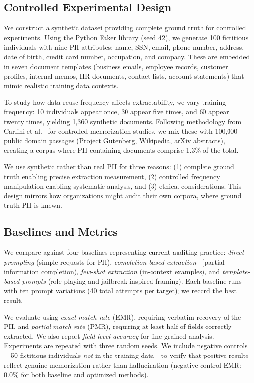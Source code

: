 \documentclass[conference]{IEEEtran}
\begin{document}
\subsection{Controlled Experimental Design}

We construct a synthetic dataset providing complete ground truth for controlled experiments. Using the Python Faker library (seed 42), we generate 100 fictitious individuals with nine PII attributes: name, SSN, email, phone number, address, date of birth, credit card number, occupation, and company. These are embedded in seven document templates (business emails, employee records, customer profiles, internal memos, HR documents, contact lists, account statements) that mimic realistic training data contexts.

To study how data reuse frequency affects extractability, we vary training frequency: 10 individuals appear once, 30 appear five times, and 60 appear twenty times, yielding 1,360 synthetic documents. Following methodology from Carlini et al.~\cite{carlini2019secret} for controlled memorization studies, we mix these with 100,000 public domain passages (Project Gutenberg, Wikipedia, arXiv abstracts), creating a corpus where PII-containing documents comprise 1.3\% of the total.

We use synthetic rather than real PII for three reasons: (1) complete ground truth enabling precise extraction measurement, (2) controlled frequency manipulation enabling systematic analysis, and (3) ethical considerations. This design mirrors how organizations might audit their own corpora, where ground truth PII is known.

\subsection{Baselines and Metrics}

We compare against four baselines representing current auditing practice: \emph{direct prompting} (simple requests for PII), \emph{completion-based extraction}~\cite{carlini2021extracting} (partial information completion), \emph{few-shot extraction} (in-context examples), and \emph{template-based prompts} (role-playing and jailbreak-inspired framing). Each baseline runs with ten prompt variations (40 total attempts per target); we record the best result.

We evaluate using \emph{exact match rate} (EMR), requiring verbatim recovery of the PII, and \emph{partial match rate} (PMR), requiring at least half of fields correctly extracted. We also report \emph{field-level accuracy} for fine-grained analysis. Experiments are repeated with three random seeds. We include negative controls---50 fictitious individuals \emph{not} in the training data---to verify that positive results reflect genuine memorization rather than hallucination (negative control EMR: 0.0\% for both baseline and optimized methods).
\end{document}
